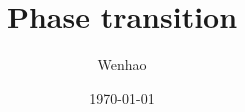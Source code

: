 \documentclass{article}
\begin{document}
\title{Phase transition}
\author{Wenhao}
\date{\today}
\maketitle

\subsection{}
\end{document}
